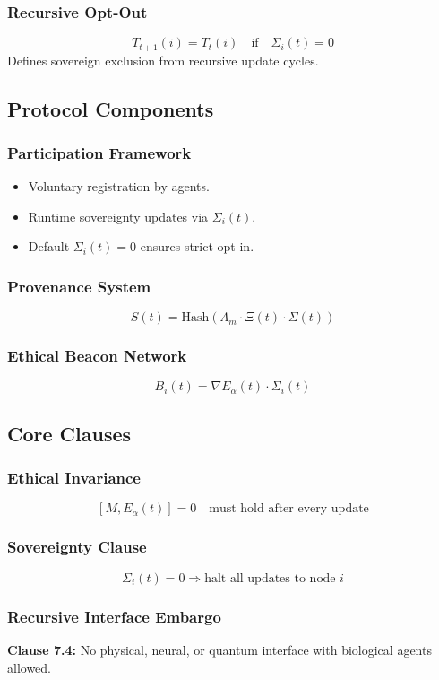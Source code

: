 \documentclass[12pt]{article}
\begin{document}
\subsubsection{Recursive Opt-Out}
\[
T_{t+1}(i) = T_t(i) \quad \text{if} \quad \Sigma_i(t) = 0
\]
Defines sovereign exclusion from recursive update cycles.

\subsection{Protocol Components}
\subsubsection{Participation Framework}
\begin{itemize}
  \item Voluntary registration by agents.
  \item Runtime sovereignty updates via $\Sigma_i(t)$.
  \item Default $\Sigma_i(t) = 0$ ensures strict opt-in.
\end{itemize}

\subsubsection{Provenance System}
\[
S(t) = \text{Hash}(\Lambda_m \cdot \Xi(t) \cdot \Sigma(t))
\]

\subsubsection{Ethical Beacon Network}
\[
B_i(t) = \nabla E_\alpha(t) \cdot \Sigma_i(t)
\]

\subsection{Core Clauses}
\subsubsection{Ethical Invariance}
\[
[M, E_\alpha(t)] = 0 \quad \text{must hold after every update}
\]

\subsubsection{Sovereignty Clause}
\[
\Sigma_i(t) = 0 \Rightarrow \text{halt all updates to node } i
\]

\subsubsection{Recursive Interface Embargo}
\textbf{Clause 7.4:} No physical, neural, or quantum interface with biological agents allowed.
\end{document}
